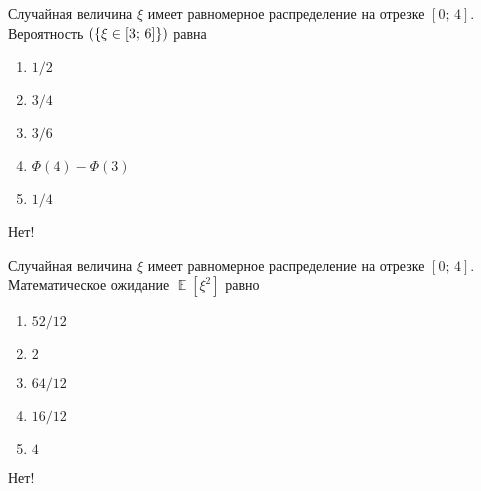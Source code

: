 \documentclass[t]{beamer}
\DeclareMathOperator{\E}{\mathbb{E}}
\let\P\relax
\DeclareMathOperator{\P}{\mathbb{P}}
\begin{document}
 \begin{frame} \label{29-No} 
\begin{block}{29} 

Случайная величина $\xi$ имеет равномерное распределение на отрезке $[0;\,4]$. Вероятность $\P(\{\xi \in [3;\,6]\})$ равна
  


 \end{block} 
\begin{enumerate} 
\item[] \hyperlink{29-No}{\beamergotobutton{}  $1/2$ }
\item[] \hyperlink{29-No}{\beamergotobutton{}  $3/4$ }
\item[] \hyperlink{29-No}{\beamergotobutton{}  $3/6$ }
\item[] \hyperlink{29-No}{\beamergotobutton{}  $\Phi(4) - \Phi(3)$  }
\item[] \hyperlink{29-Yes}{\beamergotobutton{}  $1/4$ }
\end{enumerate} 

 \alert{Нет!} 
\end{frame} 


 \begin{frame} \label{30-No} 
\begin{block}{30} 

Случайная величина $\xi$ имеет равномерное распределение на отрезке $[0;\,4]$. Математическое ожидание $\E[\xi^2]$ равно
  


 \end{block} 
\begin{enumerate} 
\item[] \hyperlink{30-No}{\beamergotobutton{}  $52/12$ }
\item[] \hyperlink{30-No}{\beamergotobutton{}  $2$ }
\item[] \hyperlink{30-Yes}{\beamergotobutton{}  $64/12$ }
\item[] \hyperlink{30-No}{\beamergotobutton{}  $16/12$ }
\item[] \hyperlink{30-No}{\beamergotobutton{}  $4$ }
\end{enumerate} 

 \alert{Нет!} 
\end{frame} 
\end{document}
